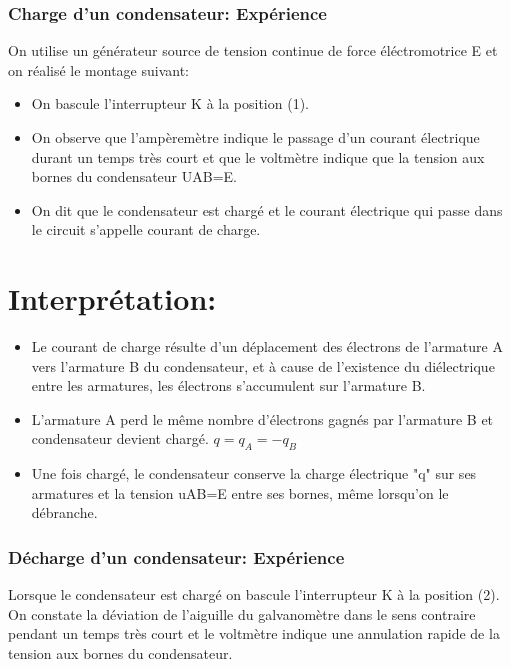 \documentclass[12pt]{article}
\begin{document}
\subsubsection{Charge d'un condensateur: Expérience }
On utilise un générateur source de tension continue de force éléctromotrice E et on réalisé le montage suivant: 




\begin{itemize}
	\item On bascule l'interrupteur K à la position (1).

	\item On observe que l'ampèremètre indique le passage d'un courant électrique durant un temps très court et que le voltmètre indique
que la tension aux bornes du condensateur UAB=E.

\item On dit que le condensateur est chargé et le courant électrique qui passe dans le circuit s'appelle courant de charge.

\end{itemize}

\section*{Interprétation: }
\begin{itemize}
	\item Le courant de charge résulte d'un déplacement des électrons de l'armature A vers l'armature B du condensateur, et à cause de l'existence du diélectrique entre les armatures, les électrons s'accumulent sur l'armature B.

	\item L'armature A perd le même nombre d'électrons gagnés par l'armature B et condensateur devient chargé. $q=q_A=-q_B$

	\item Une fois chargé, le condensateur conserve la charge électrique "q" sur ses armatures et la tension uAB=E entre
ses bornes, même lorsqu'on le débranche.

\end{itemize}


\subsubsection{Décharge d'un condensateur: Expérience }
Lorsque le condensateur est chargé on bascule l'interrupteur K à la position (2). On constate la déviation de l'aiguille du
galvanomètre dans le sens contraire pendant un temps très court et le voltmètre indique une annulation rapide de la tension aux
bornes du condensateur.
\end{document}
